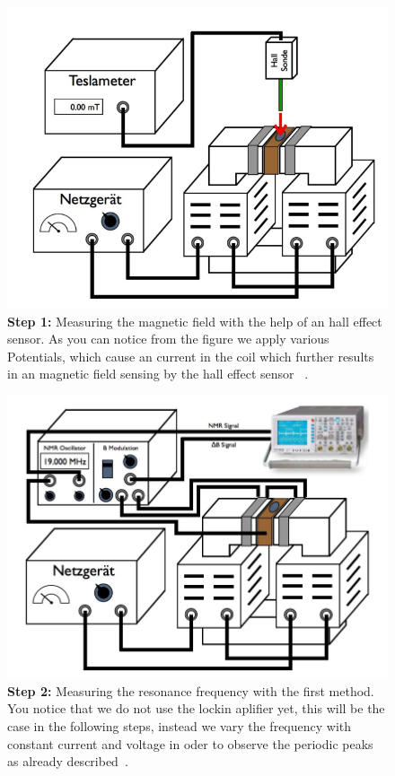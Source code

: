 \begin{figure}[htpb]
    \centering
    \includegraphics[width=0.8\linewidth]{figures/setup1}
    \caption{\textbf{Step 1:} Measuring the magnetic field with the help of 
       an hall effect sensor. As you can notice from the figure we 
      apply various Potentials, which cause an current in the coil which
      further results in an magnetic field sensing by the hall effect sensor
      ~\cite{versuchsanleitung}.}
    \label{fig:figures/setup1}
\end{figure}
\begin{figure}[htpb]
    \centering
    \includegraphics[width=0.8\linewidth]{figures/setup2}
    \caption{\textbf{Step 2:} Measuring the resonance frequency with the first
        method. You notice that we do not use the lockin aplifier yet,
        this will be the case in the following steps, instead we vary the
        frequency with constant current and voltage in oder to observe
        the periodic peaks as already described~\cite{versuchsanleitung}. }
    \label{fig:figures/setup1}
\end{figure}
